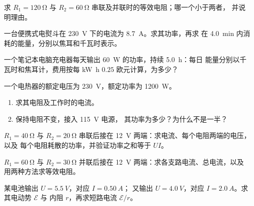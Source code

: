 \begin{exercise}[$\star$]\label{exo:g11:circuits-and-power:3}
求 $R_1 = \qty{120}{\ohm}$ 与 $R_2 =
\qty{60}{\ohm}$ 串联及并联时的等效电阻；哪一个小于两者，
并说明理由。
\end{exercise}

\begin{exercise}[$\star$]\label{exo:g11:circuits-and-power:4}
一台便携式电熨斗在 \qty{230}{V} 下的电流为 \qty{8.7}{A}。求其功率，再求
在 \qty{4.0}{min} 内消耗的能量，分别以焦耳和千瓦时表示。
\end{exercise}

\begin{exercise}[$\star$]\label{exo:g11:circuits-and-power:5}
一个笔记本电脑充电器每天输出 \qty{60}{W} 的功率，持续 \qty{5.0}{h}：每日
能量分别以千瓦时和焦耳计，费用按每
\unit{kW.h} $0.25$ 欧元计算，为多少？
\end{exercise}

\begin{exercise}[$\star\star$]\label{exo:g11:circuits-and-power:6}
一个电热器的额定电压为 \qty{230}{V}，额定功率为 \qty{1200}{W}。
\begin{enumerate}
  \item 求其电阻及工作时的电流。
  \item 保持电阻不变，接入 \qty{115}{V} 电源，
        其功率为多少？为什么不是一半？
\end{enumerate}
\end{exercise}

\begin{exercise}[$\star\star$]\label{exo:g11:circuits-and-power:7}
$R_1 = \qty{40}{\ohm}$ 与 $R_2 = \qty{20}{\ohm}$ 串联后接在
\qty{12}{V} 两端：求电流、每个电阻两端的电压，以及
每个电阻耗散的功率，并验证功率之和等于 $UI$。
\end{exercise}

\begin{exercise}[$\star\star$]\label{exo:g11:circuits-and-power:8}
$R_1 = \qty{60}{\ohm}$ 与 $R_2 = \qty{30}{\ohm}$ 并联后接在
\qty{12}{V} 两端：求各支路电流、总电流，以及
用两种方法求等效电阻。
\end{exercise}

\begin{exercise}[$\star\star$]\label{exo:g11:circuits-and-power:9}
某电池输出 $U = \qty{5.5}{V}$，对应 $I = \qty{0.50}{A}$；
又输出 $U = \qty{4.0}{V}$，对应 $I = \qty{2.0}{A}$。求其电动势 $\mathcal{E}$ 与
内阻 $r$，再求短路电流 $\mathcal{E}/r$。
\end{exercise}

